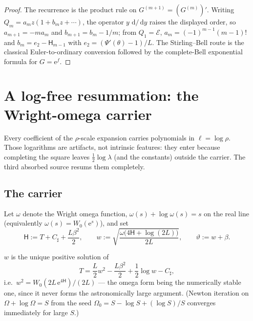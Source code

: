 \documentclass[11pt,oneside]{article}
\numberwithin{equation}{section}
\theoremstyle{definition}
\theoremstyle{remark}
\newcommand{\dd}{\,\mathrm d}
\newcommand{\e}{\mathrm e}
\newcommand{\LambertW}{W}
\newcommand{\Csharp}{C_{\sharp}}
\newcommand{\Hnum}{\mathsf H}
\begin{document}
\begin{proof}
The recurrence is the product rule on
$G^{(m+1)}=(G^{(m)})'$.  Writing
$Q_m=a_mz(1+b_mz+\cdots)$, the operator $y\,\dd/\dd y$ raises the
displayed order, so $a_{m+1}=-ma_m$ and $b_{m+1}=b_m-1/m$; from
$Q_1=\mathcal E$, $a_m=(-1)^{m-1}(m-1)!$ and
$b_m=e_2-\Hnum_{m-1}$ with $e_2=(\Psi'(\theta)-1)/L$.  The
Stirling--Bell route is the classical Euler-to-ordinary conversion
followed by the complete-Bell exponential formula for
$G=\e^{f}$.
\end{proof}


\section{A log-free resummation: the Wright-omega carrier}
\label{sec:wcarrier}

Every coefficient of the $\rho$-scale expansion carries polynomials in
$\ell=\log\rho$.  Those logarithms are artifacts, not intrinsic
features: they enter because completing the square leaves
$\tfrac12\log\lambda$ (and the constants) outside the carrier.  The
third absorbed source resums them completely.

\subsection{The carrier}

Let $\omega$ denote the Wright omega function,
$\omega(s)+\log\omega(s)=s$ on the real line
(equivalently $\omega(s)=\LambertW_0(\e^{s})$), and set
\begin{equation}
 \mathsf H:=T+\Csharp+\frac{L\beta^{2}}2,
 \qquad
 w:=\sqrt{\frac{\omega\bigl(4\mathsf H+\log(2L)\bigr)}{2L}},
 \qquad
 \vartheta:=w+\beta.
 \label{eq:w-def}
\end{equation}

\begin{proposition}
\label{prop:carrier-equation}
$w$ is the unique positive solution of
\begin{equation}
 T=\frac L2w^{2}-\frac{L\beta^{2}}2+\frac12\log w-\Csharp,
 \label{eq:w-carrier}
\end{equation}
i.e.\ $w^{2}=\LambertW_0(2L\,\e^{4\mathsf H})/(2L)$ --- the omega form
being the numerically stable one, since it never forms the
astronomically large argument.  (Newton iteration on
$\Omega+\log\Omega=S$ from the seed $\Omega_0=S-\log S+(\log S)/S$
converges immediately for large $S$.)
\end{proposition}
\end{document}
